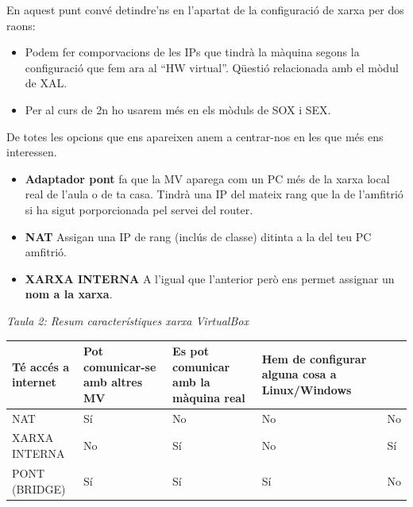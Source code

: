 \documentclass[
  spanish,
  12 pt,
  a4paper,
]{article}
\begin{document}
En aquest punt convé detindre'ns en l'apartat de la configuració de
xarxa per dos raons:

\begin{itemize}
\item
  Podem fer comporvacions de les IPs que tindrà la màquina segons la
  configuració que fem ara al ``HW virtual''. Qüestió relacionada amb el
  mòdul de XAL.
\item
  Per al curs de 2n ho usarem més en els mòduls de SOX i SEX.
\end{itemize}

De totes les opcions que ens apareixen anem a centrar-nos en les que més
ens interessen.

\begin{itemize}
\item
  \textbf{Adaptador pont} fa que la MV aparega com un PC més de la xarxa
  local real de l'aula o de ta casa. Tindrà una IP del mateix rang que
  la de l'amfitrió si ha sigut porporcionada pel servei del router.
\item
  \textbf{NAT} Assigan una IP de rang (inclús de classe) ditinta a la
  del teu PC amfitrió.
\item
  \textbf{XARXA INTERNA} A l'igual que l'anterior però ens permet
  assignar un \textbf{nom a la xarxa}.
\end{itemize}

\emph{Taula 2: Resum característiques xarxa VirtualBox}

\begin{longtable}[]{@{}
  >{\raggedright\arraybackslash}p{}
  >{\raggedright\arraybackslash}p{}
  >{\raggedright\arraybackslash}p{}
  >{\raggedright\arraybackslash}p{}
  >{\raggedright\arraybackslash}p{}@{}}
\toprule\noalign{}
\begin{minipage}[b]{\linewidth}\raggedright
Té accés a internet
\end{minipage} & \begin{minipage}[b]{\linewidth}\raggedright
Pot comunicar-se amb altres MV
\end{minipage} & \begin{minipage}[b]{\linewidth}\raggedright
Es pot comunicar amb la màquina real
\end{minipage} & \begin{minipage}[b]{\linewidth}\raggedright
Hem de configurar alguna cosa a Linux/Windows
\end{minipage} & \begin{minipage}[b]{\linewidth}\raggedright
\end{minipage} \\
\midrule\noalign{}
\endhead
\bottomrule\noalign{}
\endlastfoot
NAT & Sí & No & No & No \\
XARXA INTERNA & No & Sí & No & Sí \\
PONT (BRIDGE) & Sí & Sí & Sí & No \\
\end{longtable}
\end{document}
